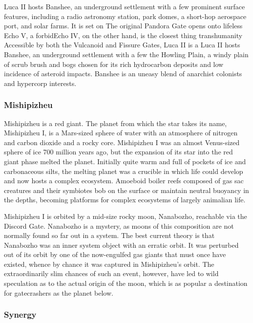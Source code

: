 Luca II hosts Banshee, an underground settlement with a few 
prominent surface features, including a radio astronomy station, 
park domes, a short-hop aerospace port, and solar farms. It is set on 
The original Pandora Gate opens onto lifeless Echo V, a forbidEcho IV, on the other hand, is the closest thing transhumanity 
Accessible by both the Vulcanoid and Fissure Gates, Luca II is a 
Luca II hosts Banshee, an underground settlement with a few 
the Howling Plain, a windy plain of scrub brush and 
bogs chosen for its rich hydrocarbon deposits and low 
incidence of asteroid impacts. Banshee is an uneasy 
blend of anarchist colonists and hypercorp interests.

\subsubsection{Mishipizheu}

Mishipizheu is a red giant. The planet from which 
the star takes its name, Mishipizheu I, is a Mars-sized 
sphere of water with an atmosphere of nitrogen and 
carbon dioxide and a rocky core. Mishipizheu I was 
an almost Venus-sized sphere of ice 700 million years 
ago, but the expansion of its star into the red giant 
phase melted the planet. Initially quite warm and full 
of pockets of ice and carbonaceous silts, the melting 
planet was a crucible in which life could develop and 
now hosts a complex ecosystem. Amoeboid boiler 
reefs composed of gas sac creatures and their symbiotes bob on the surface or maintain neutral buoyancy 
in the depths, becoming platforms for complex ecosystems of largely animalian life.

Mishipizheu I is orbited by a mid-size rocky moon, 
Nanabozho, reachable via the Discord Gate. Nanabozho is a mystery, as moons of this composition are 
not normally found so far out in a system. The best 
current theory is that Nanabozho was an inner system 
object with an erratic orbit. It was perturbed out of 
its orbit by one of the now-engulfed gas giants that 
must once have existed, whence by chance it was 
captured in Mishipizheu's orbit. The extraordinarily 
slim chances of such an event, however, have led to 
wild speculation as to the actual origin of the moon, 
which is as popular a destination for gatecrashers as 
the planet below.

\subsubsection{Synergy}

